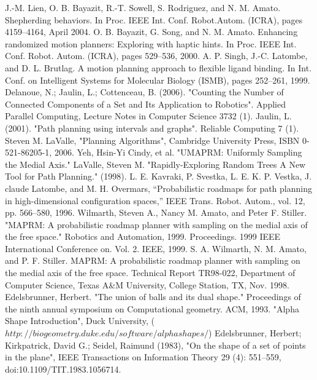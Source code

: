 \documentclass[11pt]{article}
\begin{document}

\begin{thebibliography}{1}
   J.-M. Lien, O. B. Bayazit, R.-T. Sowell, S. Rodriguez, and N. M. Amato. Shepherding behaviors. In Proc. IEEE Int. Conf. Robot.Autom. (ICRA), pages 4159–4164, April 2004.
   O. B. Bayazit, G. Song, and N. M. Amato. Enhancing randomized motion planners: Exploring with haptic hints. In Proc. IEEE Int. Conf. Robot. Autom. (ICRA), pages 529–536, 2000.
   A. P. Singh, J.-C. Latombe, and D. L. Brutlag. A motion planning approach to flexible ligand binding. In Int. Conf. on Intelligent Systems for Molecular Biology (ISMB), pages 252–261, 1999.
   Delanoue, N.; Jaulin, L.; Cottenceau, B. (2006). "Counting the Number of Connected Components of a Set and Its Application to Robotics". Applied Parallel Computing, Lecture Notes in Computer Science 3732 (1).
   Jaulin, L. (2001). "Path planning using intervals and graphs". Reliable Computing 7 (1).  
   Steven M. LaValle, "Planning Algorithms", Cambridge University Press, ISBN 0-521-86205-1, 2006.
   Yeh, Hsin-Yi Cindy, et al. "UMAPRM: Uniformly Sampling the Medial Axis."
   LaValle, Steven M. "Rapidly-Exploring Random Trees A New Tool for Path Planning." (1998).
   L. E. Kavraki, P. Svestka, L. E. K. P. Vestka, J. claude Latombe, and M. H. Overmars, “Probabilistic roadmaps for path planning in high-dimensional configuration spaces,” IEEE Trans. Robot. Autom., vol. 12, pp. 566–580, 1996.
   Wilmarth, Steven A., Nancy M. Amato, and Peter F. Stiller. "MAPRM: A probabilistic roadmap planner with sampling on the medial axis of the free space." Robotics and Automation, 1999. Proceedings. 1999 IEEE International Conference on. Vol. 2. IEEE, 1999.
   S. A. Wilmarth, N. M. Amato, and P. F. Stiller. MAPRM: A probabilistic roadmap planner with sampling on the medial axis of the free space. Technical Report TR98-022, Department of Computer Science, Texas A\&M University, College Station, TX, Nov. 1998.
   Edelsbrunner, Herbert. "The union of balls and its dual shape." Proceedings of the ninth annual symposium on Computational geometry. ACM, 1993.
   "Alpha Shape Introduction", Duck University, ($http://biogeometry.duke.edu/software/alphashapes/$)
   Edelsbrunner, Herbert; Kirkpatrick, David G.; Seidel, Raimund (1983), "On the shape of a set of points in the plane", IEEE Transactions on Information Theory 29 (4): 551–559, doi:10.1109/TIT.1983.1056714.

\end{thebibliography}
\end{document}
